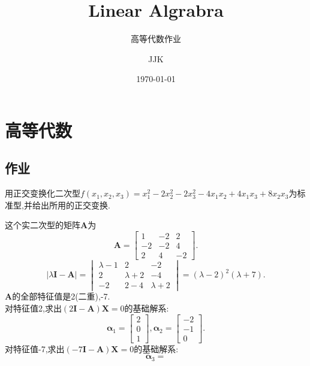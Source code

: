 \documentclass[lang=cn,11pt,normal]{elegantbook}
\title{Linear Algrabra}
\subtitle{高等代数作业}
\author{JJK}
\institute{Jiang Xi science and technology University}
\date{\today}
\renewcommand{\AA}{\boldsymbol{A}}
\newcommand{\XX}{\boldsymbol{X}}
\newcommand{\II}{\boldsymbol{I}}
\begin{document}
	\maketitle
	\mainmatter
	\hypersetup{pageanchor=true}
	\chapter{高等代数}
	\section{作业}
	\begin{exercise}
		用正交变换化二次型$f(x_1,x_2,x_3)=x_1^2-2x_2^2-2x_3^2-4x_1x_2+4x_1x_3+8x_2x_3$为标准型,并给出所用的正交变换.
	\end{exercise}
	\begin{solution}
		这个实二次型的矩阵$\AA$为\\
		\begin{equation}
			\AA=
			\begin{bmatrix}
			1&-2&2\\
			-2&-2&4\\
			2&4&-2
			\end{bmatrix}.
		\end{equation}
		\begin{equation}
			|\lambda\II-\AA|=
			\begin{vmatrix}
			\lambda-1&2&-2\\
			2&\lambda+2&-4\\
			-2&2-4&\lambda+2
			\end{vmatrix}
			=(\lambda-2)^2(\lambda+7).
		\end{equation}
		$\AA$的全部特征值是2(二重),-7.\\
		对特征值2,求出$(2\II-\AA)\XX=0$的基础解系:
		\begin{equation}
		\boldsymbol{\alpha}_1=
		\begin{bmatrix}
		2\\
		0\\
		1
		\end{bmatrix},
		\boldsymbol{\alpha}_2=
		\begin{bmatrix}
		-2\\
		-1\\
		0
		\end{bmatrix}.
		\end{equation}
		对特征值-7,求出$(-7\II-\AA)\XX=0$的基础解系:\\
		\begin{equation}
		\boldsymbol{\alpha}_3=

\end{equation}
\end{solution}
\end{document}
